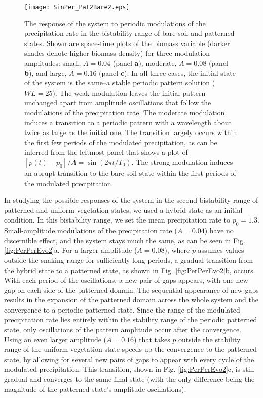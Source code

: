 \documentclass[aps,prl,preprint,superscriptaddress,floatfix]{revtex4-1}
\begin{document}
\begin{figure}
 \texttt{[image: SinPer\_Pat2Bare2.eps]}
   \caption{The response of the system to periodic modulations of the precipitation rate in the bistability range of bare-soil and patterned states. 
 Shown are space-time plots of the biomass variable (darker shades denote higher biomass density) for three modulation amplitudes: small, $A=0.04$ (panel \textbf{a}), moderate, $A=0.08$ (panel \textbf{b}), and large, $A=0.16$ (panel \textbf{c}). 
 In all three cases, the initial state of the system is the same--a stable periodic pattern solution ($WL=25$). 
 The weak modulation leaves the initial pattern unchanged apart from amplitude oscillations that follow the modulations of the precipitation rate. 
 The moderate modulation induces a transition to a periodic pattern with a wavelength about twice as large as the initial one. 
 The transition largely occurs within the first few periods of the modulated precipitation, as can be inferred from the leftmost panel that shows a plot of $[p(t)-p_0]/A=\sin{(2\pi t/T_0)}$. 
 The strong modulation induces an abrupt transition to the bare-soil state within the first periods of the modulated precipitation. \label{fig:PerPerEvo1}}
\end{figure}

In studying the possible responses of the system in the second bistability range of patterned and uniform-vegetation states, we used a hybrid state as an initial condition.
In this bistability range, we set the mean precipitation rate to $p_0=1.3$.
Small-amplitude modulations of the precipitation rate ($A=0.04$) have no discernible effect, and the system stays much the same, as can be seen in Fig. \ref{fig:PerPerEvo2}a.
For a larger amplitude ($A=0.08$), where $p$ assumes values outside the snaking range for sufficiently long periods, a gradual transition from the hybrid state to a patterned state, as shown in Fig. \ref{fig:PerPerEvo2}b, occurs. 
With each period of the oscillations, a new pair of gaps appears, with one new gap on each side of the patterned domain. 
The sequential appearance of new gaps results in the expansion of the patterned domain across the whole system and the convergence to a periodic patterned state. 
Since the range of the modulated precipitation rate lies entirely within the stability range of the periodic patterned state, only oscillations of the pattern amplitude occur after the convergence.
Using an even larger amplitude ($A=0.16$) that takes $p$ outside the stability range of the uniform-vegetation state speeds up the convergence to the patterned state, 
by allowing for several new pairs of gaps to appear with every cycle of the modulated precipitation.
This transition, shown in Fig. \ref{fig:PerPerEvo2}c, is still gradual and converges to the same final state (with the only difference being the magnitude of the patterned state’s amplitude oscillations).
\end{document}
